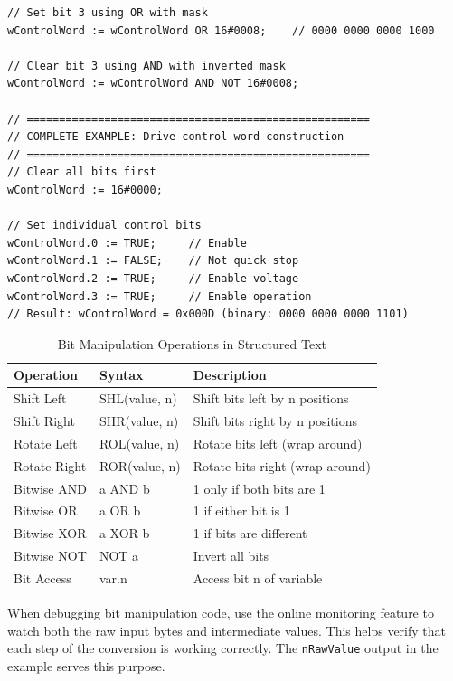 \documentclass[11pt,a4paper]{article}
\begin{document}
\begin{lstlisting}
// Set bit 3 using OR with mask
wControlWord := wControlWord OR 16#0008;    // 0000 0000 0000 1000

// Clear bit 3 using AND with inverted mask
wControlWord := wControlWord AND NOT 16#0008;

// =====================================================
// COMPLETE EXAMPLE: Drive control word construction
// =====================================================
// Clear all bits first
wControlWord := 16#0000;

// Set individual control bits
wControlWord.0 := TRUE;     // Enable
wControlWord.1 := FALSE;    // Not quick stop
wControlWord.2 := TRUE;     // Enable voltage
wControlWord.3 := TRUE;     // Enable operation
// Result: wControlWord = 0x000D (binary: 0000 0000 0000 1101)
\end{lstlisting}

\begin{table}[h]
\centering
\begin{tabular}{@{}llp{6cm}@{}}
\toprule
\textbf{Operation} & \textbf{Syntax} & \textbf{Description} \\
\midrule
Shift Left & SHL(value, n) & Shift bits left by n positions \\
Shift Right & SHR(value, n) & Shift bits right by n positions \\
Rotate Left & ROL(value, n) & Rotate bits left (wrap around) \\
Rotate Right & ROR(value, n) & Rotate bits right (wrap around) \\
Bitwise AND & a AND b & 1 only if both bits are 1 \\
Bitwise OR & a OR b & 1 if either bit is 1 \\
Bitwise XOR & a XOR b & 1 if bits are different \\
Bitwise NOT & NOT a & Invert all bits \\
Bit Access & var.n & Access bit n of variable \\
\bottomrule
\end{tabular}
\caption{Bit Manipulation Operations in Structured Text}
\end{table}

\begin{tipbox}
When debugging bit manipulation code, use the online monitoring feature to watch both the raw input bytes and intermediate values. This helps verify that each step of the conversion is working correctly. The \texttt{nRawValue} output in the example serves this purpose.
\end{tipbox}
\end{document}
